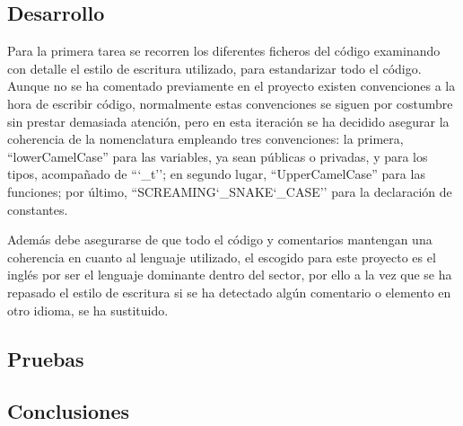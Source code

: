     \subsection{Desarrollo}
    
        Para la primera tarea se recorren los diferentes ficheros del código examinando con detalle el estilo de escritura utilizado, para estandarizar todo el código. Aunque no se ha comentado previamente en el proyecto existen convenciones a la hora de escribir código, normalmente estas convenciones se siguen por costumbre sin prestar demasiada atención, pero en esta iteración se ha decidido asegurar la coherencia de la nomenclatura empleando tres convenciones: la primera,  ``lowerCamelCase'' para las variables, ya sean públicas o privadas, y para los tipos, acompañado de ``\char`_t''; en segundo lugar, ``UpperCamelCase'' para las funciones; por último,  ``SCREAMING\char`_SNAKE\char`_CASE'' para la declaración de constantes.
        
        Además debe asegurarse de que todo el código y comentarios mantengan una coherencia en cuanto al lenguaje utilizado, el escogido para este proyecto es el inglés por ser el lenguaje dominante dentro del sector, por ello a la vez que se ha repasado el estilo de escritura si se ha detectado algún comentario o elemento en otro idioma, se ha sustituido.
    \subsection{Pruebas}
    \subsection{Conclusiones}